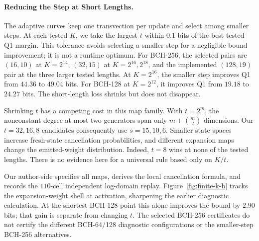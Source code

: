 \paragraph{Reducing the Step at Short Lengths.}
The adaptive curves keep one transvection per update and select among
smaller steps. At each tested $K$, we take the largest $t$ within $0.1$
bits of the best tested Q1 margin. This tolerance avoids selecting a
smaller step for a negligible bound improvement; it is not a runtime optimum.
For BCH-256, the selected pairs are $(16,10)$ at $K=2^{14}$, $(32,15)$
at $K=2^{16},2^{18}$, and the implemented $(128,19)$ pair at the three
larger tested lengths. At $K=2^{16}$, the smaller step improves Q1 from
$44.36$ to $49.04$ bits. For BCH-128 at $K=2^{12}$, it improves Q1 from
$19.18$ to $24.27$ bits. The short-length loss shrinks but does not disappear.

Shrinking $t$ has a competing cost in this map family. With $t=2^m$,
the nonconstant degree-at-most-two generators span only $m+\binom m2$
dimensions. Our $t=32,16,8$ candidates consequently use $s=15,10,6$.
Smaller state spaces increase fresh-state cancellation probabilities, and
different expansion maps change the emitted-weight distribution.
Indeed, $t=8$ wins at none of the tested lengths. There is no evidence here
for a universal rule based only on $K/t$.

Our author-side
specifies all maps, derives the local cancellation formula, and records
the $110$-cell independent log-domain replay. Figure~\ref{fig:finite-k-b}
tracks the expansion-weight shell at activation, sharpening the earlier
diagnostic calculation. At the shortest BCH-128 point this alone improves
the bound by $2.90$ bits; that gain is separate from changing $t$.
The selected BCH-256 certificates do not certify the different BCH-64/128 diagnostic configurations
or the smaller-step BCH-256 alternatives.


